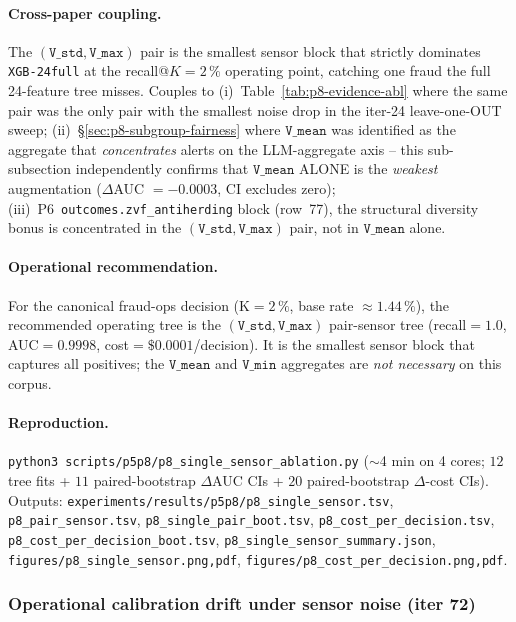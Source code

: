 \documentclass{article}
\providecommand{\tableref}[1]{Table~\ref{#1}}
\begin{document}
\paragraph{Cross-paper coupling.}
The $(\texttt{V\_std}, \texttt{V\_max})$ pair is the smallest sensor
block that strictly dominates \texttt{XGB-24full} at the
recall@$K{=}2\,\%$ operating point, catching one fraud the full
24-feature tree misses. Couples to (i)~\tableref{tab:p8-evidence-abl}
where the same pair was the only pair with the smallest noise
drop in the iter-24 leave-one-OUT sweep; (ii)~\S\ref{sec:p8-subgroup-fairness}
where $\texttt{V\_mean}$ was identified as the aggregate that
\emph{concentrates} alerts on the LLM-aggregate axis -- this
sub-subsection independently confirms that $\texttt{V\_mean}$ ALONE
is the \emph{weakest} augmentation ($\Delta$AUC $=-0.0003$, CI
excludes zero); (iii)~P6~\texttt{outcomes.zvf\_antiherding} block
(row~77), the structural diversity bonus is concentrated in the
$(\texttt{V\_std}, \texttt{V\_max})$ pair, not in $\texttt{V\_mean}$
alone.

\paragraph{Operational recommendation.}
For the canonical fraud-ops decision (K$ = 2\,\%$, base rate
$\approx 1.44\,\%$), the recommended operating tree is the
$(\texttt{V\_std}, \texttt{V\_max})$ pair-sensor tree (recall$ = 1.0$,
AUC$ = 0.9998$, cost$ = \$0.0001$/decision). It is the smallest
sensor block that captures all positives; the $\texttt{V\_mean}$
and $\texttt{V\_min}$ aggregates are \emph{not necessary} on this
corpus.

\paragraph{Reproduction.}
\texttt{python3 scripts/p5p8/p8\_single\_sensor\_ablation.py}
($\sim$4 min on 4 cores; $12$ tree fits + $11$ paired-bootstrap
$\Delta$AUC CIs + $20$ paired-bootstrap $\Delta$-cost CIs).
Outputs: \texttt{experiments/results/p5p8/p8\_single\_sensor.tsv},
\texttt{p8\_pair\_sensor.tsv}, \texttt{p8\_single\_pair\_boot.tsv},
\texttt{p8\_cost\_per\_decision.tsv},
\texttt{p8\_cost\_per\_decision\_boot.tsv},
\texttt{p8\_single\_sensor\_summary.json},
\texttt{figures/p8\_single\_sensor.{png,pdf}},
\texttt{figures/p8\_cost\_per\_decision.{png,pdf}}.

\subsubsection{Operational calibration drift under sensor noise (iter 72)}
\label{sec:p8-calib-noise}
\end{document}
